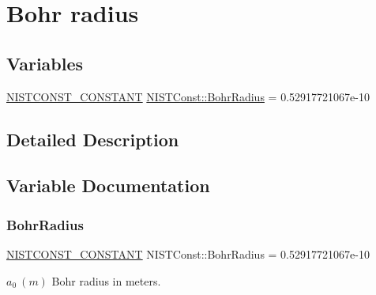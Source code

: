 \hypertarget{group___n_i_s_t_const-_bohr_radius}{}\section{Bohr radius}
\label{group___n_i_s_t_const-_bohr_radius}
\subsection*{Variables}
\begin{DoxyCompactItemize}
\item 
\mbox{\hyperlink{_n_i_s_t_const_8hpp_a2b0fc1d7452373f816175dd86ce26729}{N\+I\+S\+T\+C\+O\+N\+S\+T\+\_\+\+C\+O\+N\+S\+T\+A\+NT}} \mbox{\hyperlink{group___n_i_s_t_const-_bohr_radius_ga9a18bd8c20d78ff8ad8747cdd623a07b}{N\+I\+S\+T\+Const\+::\+Bohr\+Radius}} = 0.\+52917721067e-\/10
\end{DoxyCompactItemize}


\subsection{Detailed Description}


\subsection{Variable Documentation}
\mbox{\label{group___n_i_s_t_const-_bohr_radius_ga9a18bd8c20d78ff8ad8747cdd623a07b}} 
\subsubsection{\texorpdfstring{Bohr\+Radius}{BohrRadius}}
{\footnotesize\ttfamily \mbox{\hyperlink{_n_i_s_t_const_8hpp_a2b0fc1d7452373f816175dd86ce26729}{N\+I\+S\+T\+C\+O\+N\+S\+T\+\_\+\+C\+O\+N\+S\+T\+A\+NT}} N\+I\+S\+T\+Const\+::\+Bohr\+Radius = 0.\+52917721067e-\/10}

$a_0 \ (m)$ Bohr radius in meters. 